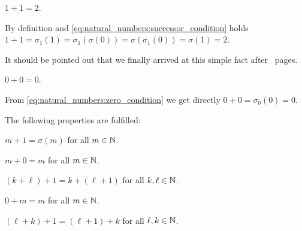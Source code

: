 \begin{examples}
    \begin{exampleenumerate}
        \item $1+1=2$.
        \begin{miniproof}
            By definition and \eqref{eq:natural_numbers:successor_condition} holds $1+1=\sigma_1(1)=\sigma_1(\sigma(0))=\sigma(\sigma_1(0))=\sigma(1)=2$.
        \end{miniproof}
        It should be pointed out that we finally arrived at this simple fact after \thepage\ pages.
        \item $0+0=0$.
        \begin{miniproof}
            From \eqref{eq:natural_numbers:zero_condition} we get directly $0+0=\sigma_0(0)=0$.
        \end{miniproof}
    \end{exampleenumerate}
\end{examples}

\begin{lemma}
    The following properties are fulfilled:
    \begin{intheoremenumerate}
        \item\label{lemma:natural_numbers:successor_by_sum} $m+1=\sigma(m)$ for all $m\in\mathbb{N}$.
        \item\label{lemma:natural_numbers:zero_right_neutral} $m+0=m$ for all $m\in\mathbb{N}$.
        \item\label{lemma:natural_numbers:basic_associativity} $(k+\ell)+1=k+(\ell+1)$ for all $k,\ell\in\mathbb{N}$.
        \item\label{lemma:natural_numbers:zero_left_neutral} $0+m=m$ for all $m\in\mathbb{N}$.
        \item\label{lemma:natural_numbers:basic_commutativity} $(\ell+k)+1=(\ell+1)+k$ for all $\ell,k\in\mathbb{N}$.
    \end{intheoremenumerate}
\end{lemma}

